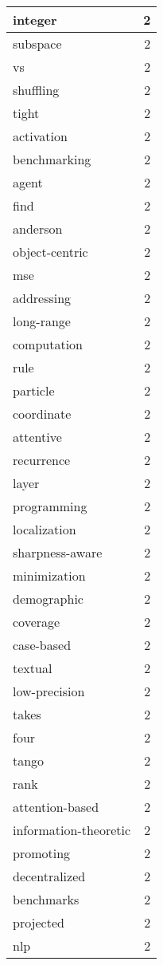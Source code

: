 \begin{table}[h]
\begin{tabular}{|l|r|}
integer & 2 \\
\hline
subspace & 2 \\
\hline
vs & 2 \\
\hline
shuffling & 2 \\
\hline
tight & 2 \\
\hline
activation & 2 \\
\hline
benchmarking & 2 \\
\hline
agent & 2 \\
\hline
find & 2 \\
\hline
anderson & 2 \\
\hline
object-centric & 2 \\
\hline
mse & 2 \\
\hline
addressing & 2 \\
\hline
long-range & 2 \\
\hline
computation & 2 \\
\hline
rule & 2 \\
\hline
particle & 2 \\
\hline
coordinate & 2 \\
\hline
attentive & 2 \\
\hline
recurrence & 2 \\
\hline
layer & 2 \\
\hline
programming & 2 \\
\hline
localization & 2 \\
\hline
sharpness-aware & 2 \\
\hline
minimization & 2 \\
\hline
demographic & 2 \\
\hline
coverage & 2 \\
\hline
case-based & 2 \\
\hline
textual & 2 \\
\hline
low-precision & 2 \\
\hline
takes & 2 \\
\hline
four & 2 \\
\hline
tango & 2 \\
\hline
rank & 2 \\
\hline
attention-based & 2 \\
\hline
information-theoretic & 2 \\
\hline
promoting & 2 \\
\hline
decentralized & 2 \\
\hline
benchmarks & 2 \\
\hline
projected & 2 \\
\hline
nlp & 2 \\

\end{tabular}
\end{table}
